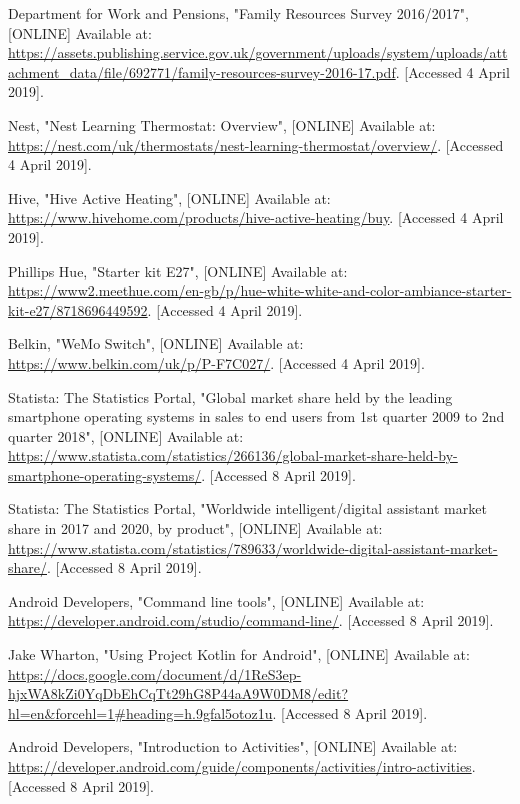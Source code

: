 \documentclass[onecolumn]{IEEEtran}
\begin{document}
{\begin{thebibliography}{10}
   Department for Work and Pensions,
 "Family Resources Survey 2016/2017",
  [ONLINE] Available at: \url{https://assets.publishing.service.gov.uk/government/uploads/system/uploads/attachment_data/file/692771/family-resources-survey-2016-17.pdf}. [Accessed 4 April 2019].
  
  Nest,
  "Nest Learning Thermostat: Overview",
  [ONLINE] Available at: \url{https://nest.com/uk/thermostats/nest-learning-thermostat/overview/}. [Accessed 4 April 2019].
  
  Hive,
  "Hive Active Heating",
  [ONLINE] Available at: \url{https://www.hivehome.com/products/hive-active-heating/buy}. [Accessed 4 April 2019].
  
  Phillips Hue,
  "Starter kit E27",
   [ONLINE] Available at: \url{https://www2.meethue.com/en-gb/p/hue-white-white-and-color-ambiance-starter-kit-e27/8718696449592}. [Accessed 4 April 2019].
   
   Belkin,
   "WeMo Switch",
   [ONLINE] Available at: \url{https://www.belkin.com/uk/p/P-F7C027/}. [Accessed 4 April 2019].
   
    Statista: The Statistics Portal,
    "Global market share held by the leading smartphone operating systems in sales to end users from 1st quarter 2009 to 2nd quarter 2018",
     [ONLINE] Available at: \url{https://www.statista.com/statistics/266136/global-market-share-held-by-smartphone-operating-systems/}. [Accessed 8 April 2019].
   
   Statista: The Statistics Portal,
   "Worldwide intelligent/digital assistant market share in 2017 and 2020, by product",
    [ONLINE] Available at: \url{https://www.statista.com/statistics/789633/worldwide-digital-assistant-market-share/}. [Accessed 8 April 2019].
    
    Android Developers,
    "Command line tools",
     [ONLINE] Available at: \url{https://developer.android.com/studio/command-line/}. [Accessed 8 April 2019].
     
     Jake Wharton,
     "Using Project Kotlin for Android",
     [ONLINE] Available at: \url{https://docs.google.com/document/d/1ReS3ep-hjxWA8kZi0YqDbEhCqTt29hG8P44aA9W0DM8/edit?hl=en&forcehl=1#heading=h.9gfal5otoz1u}. [Accessed 8 April 2019].
     
     Android Developers,
     "Introduction to Activities",
     [ONLINE] Available at: \url{https://developer.android.com/guide/components/activities/intro-activities}. [Accessed 8 April 2019].
     

\end{thebibliography}}
\end{document}
